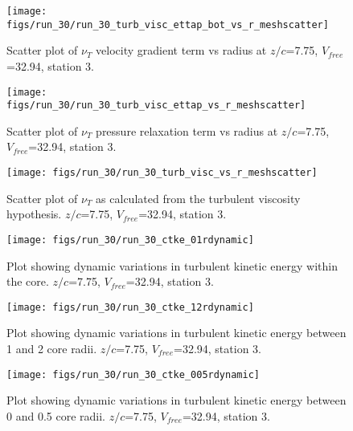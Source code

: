 \begin{figure}[H]
\centering
\texttt{[image: figs/run\_30/run\_30\_turb\_visc\_ettap\_bot\_vs\_r\_meshscatter]}
\caption{Scatter plot of $\nu_T$ velocity gradient term vs radius at $z/c$=7.75, $V_{free}$=32.94, station 3.}
\end{figure}


\begin{figure}[H]
\centering
\texttt{[image: figs/run\_30/run\_30\_turb\_visc\_ettap\_vs\_r\_meshscatter]}
\caption{Scatter plot of $\nu_T$ pressure relaxation term vs radius at $z/c$=7.75, $V_{free}$=32.94, station 3.}
\end{figure}


\begin{figure}[H]
\centering
\texttt{[image: figs/run\_30/run\_30\_turb\_visc\_vs\_r\_meshscatter]}
\caption{Scatter plot of $\nu_T$ as calculated from the turbulent viscosity hypothesis. $z/c$=7.75, $V_{free}$=32.94, station 3.}
\end{figure}


\begin{figure}[H]
\centering
\texttt{[image: figs/run\_30/run\_30\_ctke\_01rdynamic]}
\caption{Plot showing dynamic variations in turbulent kinetic energy within the core. $z/c$=7.75, $V_{free}$=32.94, station 3.}
\end{figure}


\begin{figure}[H]
\centering
\texttt{[image: figs/run\_30/run\_30\_ctke\_12rdynamic]}
\caption{Plot showing dynamic variations in turbulent kinetic energy between 1 and 2 core radii. $z/c$=7.75, $V_{free}$=32.94, station 3.}
\end{figure}


\begin{figure}[H]
\centering
\texttt{[image: figs/run\_30/run\_30\_ctke\_005rdynamic]}
\caption{Plot showing dynamic variations in turbulent kinetic energy between 0 and 0.5 core radii. $z/c$=7.75, $V_{free}$=32.94, station 3.}
\end{figure}


